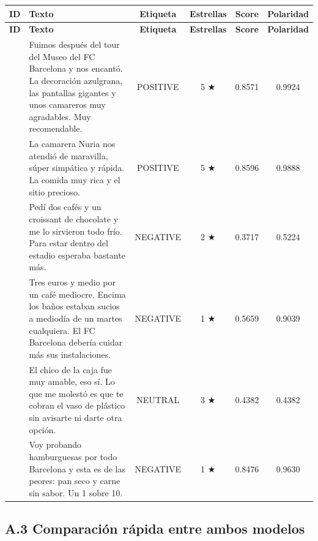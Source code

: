\documentclass[12pt,a4paper]{article}
\begin{document}
{\footnotesize\renewcommand{\arraystretch}{1.3}
\begin{longtable}{|>{\raggedright\arraybackslash}p{1.0cm}|>{\raggedright\arraybackslash}p{6.2cm}|c|c|c|c|}
\hline
\textbf{ID} & \textbf{Texto} & \textbf{Etiqueta} & \textbf{Estrellas} & \textbf{Score} & \textbf{Polaridad} \\ \hline
\endfirsthead
\hline
\textbf{ID} & \textbf{Texto} & \textbf{Etiqueta} & \textbf{Estrellas} & \textbf{Score} & \textbf{Polaridad} \\ \hline
\endhead
1 & Fuimos después del tour del Museo del FC Barcelona y nos encantó. La decoración azulgrana, las pantallas gigantes y unos camareros muy agradables. Muy recomendable. & POSITIVE & 5 ★ & 0.8571 & 0.9924 \\ \hline
2 & La camarera Nuria nos atendió de maravilla, súper simpática y rápida. La comida muy rica y el sitio precioso. & POSITIVE & 5 ★ & 0.8596 & 0.9888 \\ \hline
3 & Pedí dos cafés y un croissant de chocolate y me lo sirvieron todo frío. Para estar dentro del estadio esperaba bastante más. & NEGATIVE & 2 ★ & 0.3717 & 0.5224 \\ \hline
4 & Tres euros y medio por un café mediocre. Encima los baños estaban sucios a mediodía de un martes cualquiera. El FC Barcelona debería cuidar más sus instalaciones. & NEGATIVE & 1 ★ & 0.5659 & 0.9039 \\ \hline
5 & El chico de la caja fue muy amable, eso sí. Lo que me molestó es que te cobran el vaso de plástico sin avisarte ni darte otra opción. & NEUTRAL & 3 ★ & 0.4382 & 0.4382 \\ \hline
6 & Voy probando hamburguesas por todo Barcelona y esta es de las peores: pan seco y carne sin sabor. Un 1 sobre 10. & NEGATIVE & 1 ★ & 0.8476 & 0.9630 \\ \hline
\end{longtable}}


\subsection{A.3 Comparación rápida entre ambos modelos}
\end{document}

